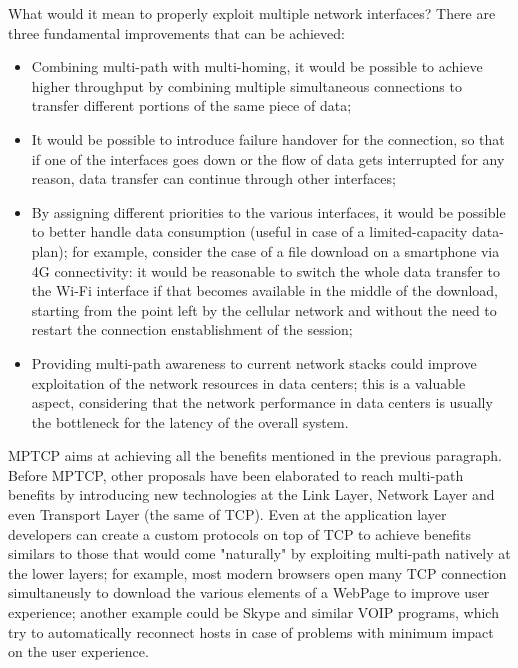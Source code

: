 \vspace{5mm}
What would it mean to properly exploit multiple network interfaces? There are three fundamental improvements that can be achieved:
\begin{itemize}
  \item Combining multi-path with multi-homing, it would be possible to achieve higher throughput by combining multiple simultaneous connections to transfer different portions of the same piece of data;
  \item It would be possible to introduce failure handover for the connection, so that if one of the interfaces goes down or the flow of data gets interrupted for any reason, data transfer can continue through other interfaces;
  \item By assigning different priorities to the various interfaces, it would be possible to better handle data consumption (useful in case of a limited-capacity data-plan); for example, consider the case of a file download on a smartphone via 4G connectivity: it would be reasonable to switch the whole data transfer to the Wi-Fi interface if that becomes available in the middle of the download, starting from the point left by the cellular network and without the need to restart the connection enstablishment of the session;
  \item Providing multi-path awareness to current network stacks could improve exploitation of the network resources in data centers; this is a valuable aspect, considering that the network performance in data centers is usually the bottleneck for the latency of the overall system.
\end{itemize}

\vspace{5mm}
MPTCP aims at achieving all the benefits mentioned in the previous paragraph. Before MPTCP, other proposals have been elaborated to reach multi-path benefits by introducing new technologies at the Link Layer, Network Layer and even Transport Layer (the same of TCP). Even at the application layer developers can create a custom protocols on top of TCP to achieve benefits similars to those that would come "naturally" by exploiting multi-path natively at the lower layers; for example, most modern browsers open many TCP connection simultaneusly to download the various elements of a WebPage to improve user experience; another example could be Skype and similar VOIP programs, which try to automatically reconnect hosts in case of problems with minimum impact on the user experience. 

